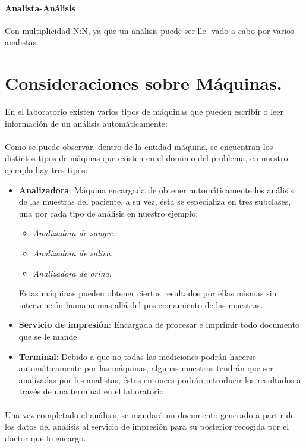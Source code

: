 \documentclass[a4paper,10pt]{article}
\begin{document}
\paragraph{Analista-Análisis}
 Con multiplicidad N:N, ya que un análisis puede ser lle-
vado a cabo por varios analistas.

\pagebreak
\section{Consideraciones sobre Máquinas.}
En el laboratorio existen varios tipos de máquinas que pueden escribir o leer información de un análisis automáticamente:
\paragraph{}
Como se puede observar, dentro de la entidad máquina, se encuentran los distintos tipos de máqinas que existen en el dominio del problema, en nuestro ejemplo hay tres tipos:
\begin{itemize}
	\item {\bf Analizadora}: Máquina encargada de obtener automáticamente los análisis de las muestras del paciente, a su vez, ésta se especializa en tres subclases, una por cada tipo de análisis en nuestro ejemplo:
	\begin{itemize}
		\item {\it Analizadora de sangre}.
		\item {\it Analizadora de saliva}.
		\item {\it Analizadora de orina}.
	\end{itemize}
	Estas máquinas pueden obtener ciertos resultados por ellas mismas sin intervención humana mas allá del posicionamiento de las muestras.
	\item {\bf Servicio de impresión}: Encargada de procesar e imprimir todo documento que se le mande.
	\item {\bf Terminal}: Debido a que no todas las mediciones podrán hacerse automáticamente por las máquinas, algunas muestras tendrán que ser analizadas por los analistas, éstos entonces podrán introducir los resultados a través de una terminal en el laboratorio.
\end{itemize}
\paragraph{}
Una vez completado el análisis, se mandará un documento generado a partir de los datos del análisis al servicio de impresión para su posterior recogida por el doctor que lo encargo.\\
\end{document}
